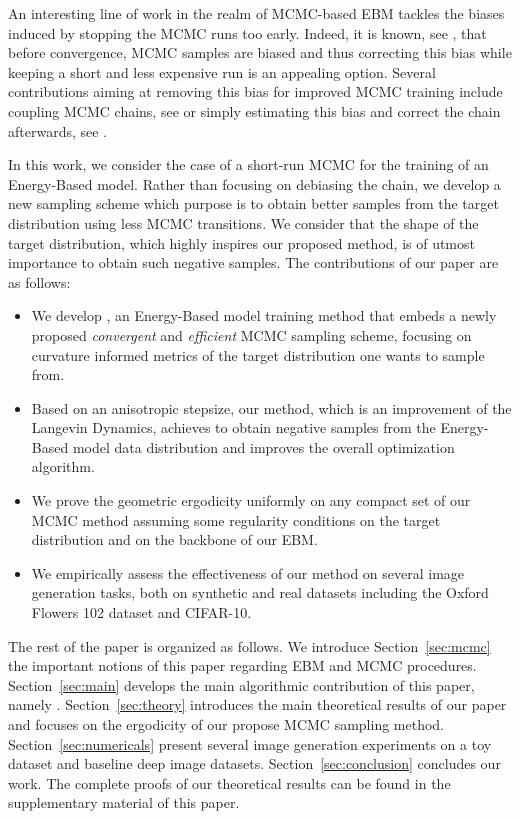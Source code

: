\documentclass[10pt,twocolumn,letterpaper]{article}
\begin{document}
An interesting line of work in the realm of MCMC-based EBM tackles the biases induced by stopping the MCMC runs too early. 
Indeed, it is known, see \cite{meyn2012markov}, that before convergence, MCMC samples are biased and thus correcting this bias while keeping a short and less expensive run is an appealing option.
Several contributions aiming at removing this bias for improved MCMC training include coupling MCMC chains, see \cite{qiu2019unbiased,jacob2020unbiased} or simply estimating this bias and correct the chain afterwards, see \cite{du2020improved}.


In this work, we consider the case of a short-run MCMC for the training of an Energy-Based model.
Rather than focusing on debiasing the chain, we develop a new sampling scheme which purpose is to obtain better samples from the target distribution using less MCMC transitions.
We consider that the shape of the target distribution, which highly inspires our proposed method, is of utmost importance to obtain such negative samples.
The contributions of our paper are as follows:

\begin{itemize}
\item We develop \algo, an Energy-Based model training method that embeds a newly proposed \emph{convergent} and \emph{efficient} MCMC sampling scheme, focusing on curvature informed metrics of the target distribution one wants to sample from.
\item Based on an anisotropic stepsize, our method, which is an improvement of the Langevin Dynamics, achieves to obtain negative samples from the Energy-Based model data distribution and improves the overall optimization algorithm.
\item We prove the geometric ergodicity uniformly on any compact set of our MCMC method assuming some regularity conditions on the target distribution and on the backbone of our EBM.
\item We empirically assess the effectiveness of our method on several image generation tasks, both on synthetic and real datasets including the Oxford Flowers 102 dataset and CIFAR-10.
\end{itemize}

The rest of the paper is organized as follows.
We introduce Section~\ref{sec:mcmc} the important notions of this paper regarding EBM and MCMC procedures.
Section~\ref{sec:main} develops the main algorithmic contribution of this paper, namely \algo.
Section~\ref{sec:theory} introduces the main theoretical results of our paper and focuses on the ergodicity of our propose MCMC sampling method.
Section~\ref{sec:numericals} present several image generation experiments on a toy dataset and baseline deep image datasets.
 Section~\ref{sec:conclusion} concludes our work.
The complete proofs of our theoretical results can be found in the supplementary material of this paper.
\end{document}
